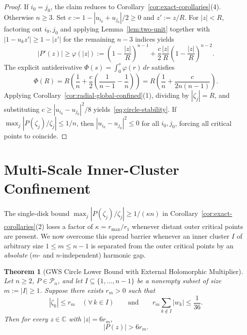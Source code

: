 \documentclass[11pt,a4paper]{article}
\newtheorem{theorem}{Theorem}[section]
\theoremstyle{definition}
\theoremstyle{remark}
\newcommand{\CC}{\mathbb{C}}
\begin{document}
\begin{proof}
If $i_0 = j_0$, the claim reduces to Corollary~\ref{cor:exact-corollaries}(4). Otherwise $n \ge 3$. Set $c := 1 - |u_{i_0} + u_{j_0}|/2 \ge 0$ and $z' := z/R$. For $|z| < R$, factoring out $i_0, j_0$ and applying Lemma~\ref{lem:two-unit} together with $|1 - u_k z'| \ge 1 - |z'|$ for the remaining $n - 3$ indices yields
\[
|P'(z)| \ge \varphi(|z|) := \left(1 - \frac{|z|}{R}\right)^{n-1} + \frac{c}{2}\frac{|z|}{R}\left(1 - \frac{|z|}{R}\right)^{n-2}.
\]
The explicit antiderivative $\Phi(s) = \int_0^s \varphi(r)\, dr$ satisfies
\[
\Phi(R) = R\left(\frac{1}{n} + \frac{c}{2}\left(\frac{1}{n - 1} - \frac{1}{n}\right)\right) = R\left(\frac{1}{n} + \frac{c}{2 n(n - 1)}\right).
\]
Applying Corollary~\ref{cor:radial-global-confined}(1), dividing by $|\zeta_j| = R$, and substituting $c \ge |u_{i_0} - u_{j_0}|^2 / 8$ yields~\eqref{eq:circle-stability}. If $\max_j |P(\zeta_j)/\zeta_j| \le 1/n$, then $|u_{i_0} - u_{j_0}|^2 \le 0$ for all $i_0, j_0$, forcing all critical points to coincide.
\end{proof}

\section{Multi-Scale Inner-Cluster Confinement}
\label{sec:multiscale}

The single-disk bound $\max_j |P(\zeta_j)/\zeta_j| \ge 1/(\kappa n)$ in Corollary~\ref{cor:exact-corollaries}(2) loses a factor of $\kappa = r_{\max}/r_1$ whenever distant outer critical points are present. We now overcome this spread barrier whenever an inner cluster $I$ of arbitrary size $1 \le m \le n - 1$ is separated from the outer critical points by an \emph{absolute} ($m$- and $n$-independent) harmonic gap.

\begin{theorem}[GWS Circle Lower Bound with External Holomorphic Multiplier]
\label{thm:circle-gap}
Let $n \ge 2$, $P \in \mathcal{P}_n$, and let $I \subseteq \{1, \dots, n - 1\}$ be a nonempty subset of size $m := |I| \ge 1$. Suppose there exists $r_m > 0$ such that
\[
|\zeta_k| \le r_m \quad (\forall\, k \in I) \qquad \text{and} \qquad r_m \sum_{k \notin I} |w_k| \le \frac{1}{36}.
\]
Then for every $z \in \CC$ with $|z| = 6 r_m$,
\[
|P(z)| > 6 r_m.
\]
\end{theorem}
\end{document}
